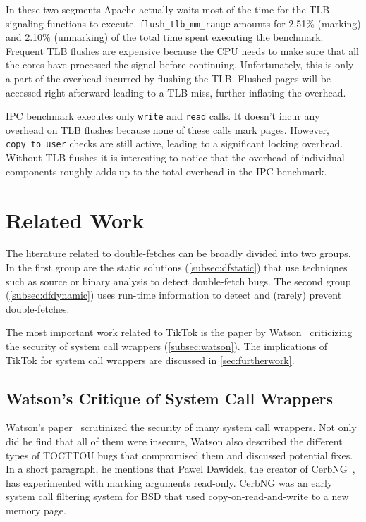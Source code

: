 \documentclass[conference]{IEEEtran}
\newcommand{\sysname}{TikTok}
\begin{document}
In these two segments Apache actually waits most of the time for the TLB
signaling functions to execute. \texttt{flush\_tlb\_mm\_range} amounts for
2.51\% (marking) and 2.10\% (unmarking) of the total time spent executing the
benchmark. Frequent TLB flushes are expensive because the CPU needs to make sure
that all the cores have processed the signal before continuing. Unfortunately,
this is only a part of the overhead incurred by flushing the TLB. Flushed pages
will be accessed right afterward leading to a TLB miss, further inflating the
overhead.

IPC benchmark executes only \texttt{write} and \texttt{read} calls. It doesn't
incur any overhead on TLB flushes because none of these calls mark pages.
However, \texttt{copy\_to\_user} checks are still active, leading to a
significant locking overhead. Without TLB flushes it is interesting to notice
that the overhead of individual components roughly adds up to the total overhead
in the IPC benchmark.


\section{Related Work}
\label{sec:relatedwork}

The literature related to double-fetches can be broadly divided into two groups.
In the first group are the static solutions (\autoref{subsec:dfstatic}) that use
techniques such as source or binary analysis to detect double-fetch bugs. The
second group (\autoref{subsec:dfdynamic}) uses run-time information to detect
and (rarely) prevent double-fetches.

The most important work related to \sysname{} is the paper by
Watson~\cite{watson2007exploiting} criticizing the security of system call
wrappers (\autoref{subsec:watson}). The implications of \sysname{} for system
call wrappers are discussed in \autoref{sec:furtherwork}.

\subsection{Watson's Critique of System Call Wrappers}
\label{subsec:watson}
Watson's paper~\cite{watson2007exploiting} scrutinized the security of many
system call wrappers. Not only did he find that all of them were insecure,
Watson also described the different types of TOCTTOU bugs that compromised them
and discussed potential fixes. In a short paragraph, he mentions that Pawel
Dawidek, the creator of CerbNG~\cite{zak_frasunek_dawidek}, has experimented
with marking arguments read-only. CerbNG was an early system call filtering
system for BSD that used copy-on-read-and-write to a new memory page.
\end{document}
